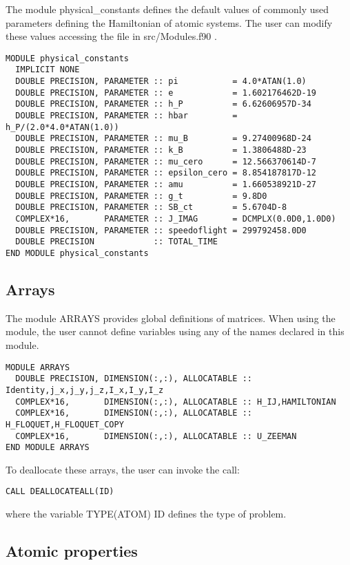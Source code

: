 \documentclass[10pt,a4paper]{article}
\begin{document}
The module   physical\_constants defines the default values of commonly used parameters defining the Hamiltonian of atomic systems. The user can modify these values accessing the file in   src/Modules.f90 .

\begin{verbatim}
MODULE physical_constants
  IMPLICIT NONE
  DOUBLE PRECISION, PARAMETER :: pi           = 4.0*ATAN(1.0)
  DOUBLE PRECISION, PARAMETER :: e            = 1.602176462D-19
  DOUBLE PRECISION, PARAMETER :: h_P          = 6.62606957D-34
  DOUBLE PRECISION, PARAMETER :: hbar         = h_P/(2.0*4.0*ATAN(1.0)) 
  DOUBLE PRECISION, PARAMETER :: mu_B         = 9.27400968D-24
  DOUBLE PRECISION, PARAMETER :: k_B          = 1.3806488D-23
  DOUBLE PRECISION, PARAMETER :: mu_cero      = 12.566370614D-7
  DOUBLE PRECISION, PARAMETER :: epsilon_cero = 8.854187817D-12 
  DOUBLE PRECISION, PARAMETER :: amu          = 1.660538921D-27
  DOUBLE PRECISION, PARAMETER :: g_t          = 9.8D0
  DOUBLE PRECISION, PARAMETER :: SB_ct        = 5.6704D-8
  COMPLEX*16,       PARAMETER :: J_IMAG       = DCMPLX(0.0D0,1.0D0)
  DOUBLE PRECISION, PARAMETER :: speedoflight = 299792458.0D0
  DOUBLE PRECISION            :: TOTAL_TIME
END MODULE physical_constants

\end{verbatim}
\newpage
\subsection{Arrays}

The module   ARRAYS  provides global definitions of matrices. When using the module, the user cannot define variables using any of the names declared in this module. 

\begin{verbatim}
MODULE ARRAYS
  DOUBLE PRECISION, DIMENSION(:,:), ALLOCATABLE :: Identity,j_x,j_y,j_z,I_x,I_y,I_z 
  COMPLEX*16,       DIMENSION(:,:), ALLOCATABLE :: H_IJ,HAMILTONIAN
  COMPLEX*16,       DIMENSION(:,:), ALLOCATABLE :: H_FLOQUET,H_FLOQUET_COPY
  COMPLEX*16,       DIMENSION(:,:), ALLOCATABLE :: U_ZEEMAN
END MODULE ARRAYS
\end{verbatim}

\noindent
To deallocate these arrays, the user can invoke the call:
\noindent
\begin{verbatim}
CALL DEALLOCATEALL(ID)
\end{verbatim}
where the variable   TYPE(ATOM)    ID  defines the type of problem.
\newpage
\subsection{Atomic properties}
\end{document}
